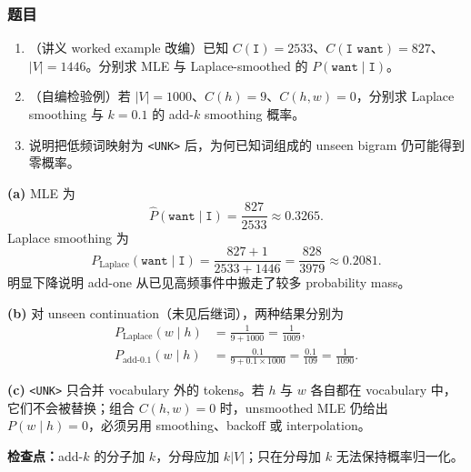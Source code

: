 \subsubsection*{题目}

\begin{enumerate}[label=(\alph*)]
  \item （讲义 worked example 改编）已知 $C(\texttt{I})=2533$、$C(\texttt{I want})=827$、$|V|=1446$。分别求 MLE 与 Laplace-smoothed 的 $P(\texttt{want}\mid\texttt{I})$。
  \item （自编检验例）若 $|V|=1000$、$C(h)=9$、$C(h,w)=0$，分别求 Laplace smoothing 与 $k=0.1$ 的 add-$k$ smoothing 概率。
  \item 说明把低频词映射为 \texttt{<UNK>} 后，为何已知词组成的 unseen bigram 仍可能得到零概率。
\end{enumerate}

\begin{workedsolution}
\textbf{(a)} MLE 为
\[
  \hat P(\texttt{want}\mid\texttt{I})
  =\frac{827}{2533}\approx0.3265.
\]
Laplace smoothing 为
\[
  P_{\mathrm{Laplace}}(\texttt{want}\mid\texttt{I})
  =\frac{827+1}{2533+1446}
  =\frac{828}{3979}\approx0.2081.
\]
明显下降说明 add-one 从已见高频事件中搬走了较多 probability mass。

\textbf{(b)} 对 unseen continuation（未见后继词），两种结果分别为
\[
\begin{aligned}
  P_{\mathrm{Laplace}}(w\mid h)
    &=\frac{1}{9+1000}=\frac{1}{1009},\\
  P_{\mathrm{add}\text{-}0.1}(w\mid h)
    &=\frac{0.1}{9+0.1\times1000}
      =\frac{0.1}{109}=\frac{1}{1090}.
\end{aligned}
\]

\textbf{(c)} \texttt{<UNK>} 只合并 vocabulary 外的 tokens。若 $h$ 与 $w$ 各自都在 vocabulary 中，它们不会被替换；组合 $C(h,w)=0$ 时，unsmoothed MLE 仍给出 $P(w\mid h)=0$，必须另用 smoothing、backoff 或 interpolation。
\end{workedsolution}

\textbf{检查点：}add-$k$ 的分子加 $k$，分母应加 $k|V|$；只在分母加 $k$ 无法保持概率归一化。
